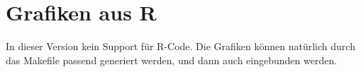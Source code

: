 \documentclass[12pt,a4paper%
              ,twoside     %
              ,titlepage
              ,DIV=13
              ,headinclude
              ,footinclude=false%
              ,cleardoublepage=empty%
              ,parskip=half,
              ]{scrreprt}
\begin{document}
\blindtext

\blindtext

\section{Grafiken aus R}

In dieser Version kein Support für R-Code. Die Grafiken können
natürlich durch das Makefile passend generiert werden, und dann
auch eingebunden werden.

\blindtext

\blindtext

\blindtext \blindtext \blindtext





\appendix

\AuthorDeclaration


\listoffigures %
\listoftables %

\renewcommand{\bibfont}{\footnotesize}
\printbibliography[title={Literaturverzeichnis}, 
                   heading=bibintoc]


{ %
\printindex
}
\end{document}
